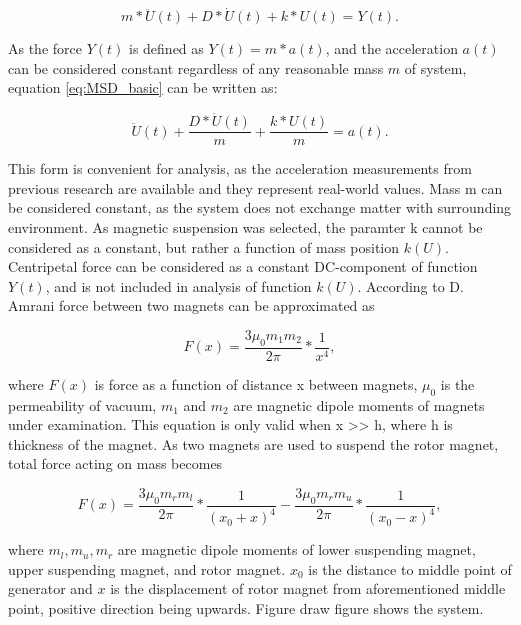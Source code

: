 \begin{equation}\label{eq:MSD_basic}
  m * \ddot{U}(t) + D * \dot{U}(t) + k * U(t) = Y(t). 
\end{equation}

As the force $ Y(t) $ is defined as $ Y(t) = m*a(t) $, and the acceleration $ a(t)$ can be considered constant regardless of any reasonable mass $ m $ of system, equation \eqref{eq:MSD_basic} can be written as:

\begin{equation}\label{eq:MSD_acceleration}
 \ddot{U}(t) + \frac{D * \dot{U}(t)}{m} + \frac{k * U(t)}{m} = a(t). 
\end{equation}

This form is convenient for analysis, as the acceleration measurements from previous research are available and they represent real-world values. Mass m can be considered constant, as the system does not exchange matter with surrounding environment. As magnetic suspension was selected, the paramter k cannot be considered as a constant, but rather a function of mass position $k(U)$. Centripetal force can be considered as a constant DC-component of function $Y(t)$, and is not included in analysis of function $k(U)$. According to D. Amrani \cite{Amrani2015} force between two magnets can be approximated as

\begin{equation}\label{eq:magnetic_force}
  F(x) = \frac{3 \mu_0 m_1 m_2}{2 \pi} * \frac{1}{x^4},
\end{equation}

where $F(x)$ is force as a function of distance x between magnets, $\mu_0$ is the permeability of vacuum, $ m_1 $ and $ m_2 $ are magnetic dipole moments of magnets under examination. This equation is only valid when x >> h, where h is thickness of the magnet. As two magnets are used to suspend the rotor magnet, total force acting on mass becomes 

\begin{equation}\label{eq:magnetic_force_middle}
  F(x) = \frac{3 \mu_0 m_r m_l}{2 \pi} * \frac{1}{(x_0+x)^4} - \frac{3 \mu_0 m_r m_u}{2 \pi} * \frac{1}{(x_0-x)^4},
\end{equation}

where $m_l, m_u, m_r$ are magnetic dipole moments of lower suspending magnet, upper suspending magnet, and rotor magnet. $x_0$ is the distance to middle point of generator and $x$ is the displacement of rotor magnet from aforementioned middle point, positive direction being upwards. Figure {\color{red}draw figure} shows the system.

